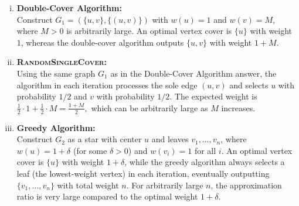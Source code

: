 \documentclass[11pt,addpoints,answers]{exam}
\begin{document}
\begin{questions}
\begin{parts}
    \begin{solution}
    \begin{enumerate}[(i)]
    \item \textbf{Double-Cover Algorithm:}\\
    Construct $G_1=(\{u,v\},\{(u,v)\})$ with $w(u)=1$ and $w(v)=M$, where $M>0$ is arbitrarily large. An optimal vertex cover is $\{u\}$ with weight $1$, whereas the double-cover algorithm outputs $\{u,v\}$ with weight $1+M$.
    \vspace{1ex}
    
    \item \textbf{\textsc{RandomSingleCover}:}\\
    Using the same graph $G_1$ as in the Double-Cover Algorithm answer, the algorithm in each iteration processes the sole edge $(u,v)$ and selects $u$ with probability $1/2$ and $v$ with probability $1/2$. The expected weight is 
    $
    \frac{1}{2}\cdot1+\frac{1}{2}\cdot M=\frac{1+M}{2},
    $
    which can be arbitrarily large as $M$ increases.
    \vspace{1ex}
    
    \item \textbf{Greedy Algorithm:}\\
    Construct $G_2$ as a star with center $u$ and leaves $v_1,\ldots,v_n$, where $w(u)=1+\delta$ (for some $\delta>0$) and $w(v_i)=1$ for all $i$. An optimal vertex cover is $\{u\}$ with weight $1+\delta$, while the greedy algorithm always selects a leaf (the lowest-weight vertex) in each iteration, eventually outputting $\{v_1,\ldots,v_n\}$ with total weight $n$. For arbitrarily large $n$, the approximation ratio is very large compared to the optimal weight $1+\delta$.
    \end{enumerate}
    \end{solution}
  \end{parts}

\end{questions}
\end{document}
